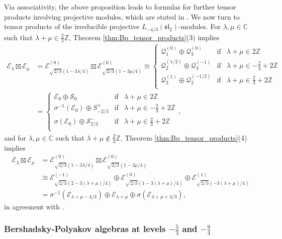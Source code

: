 \documentclass[11pt, reqno]{amsart}
\theoremstyle{definition}\newtheorem{defi}[thm]{Definition}
\theoremstyle{definition}\newtheorem{rem}[thm]{Remark}
\theoremstyle{definition}\newtheorem{exam}[thm]{Example}
\theoremstyle{definition}\newtheorem{assum}[thm]{Assumption}
\newcommand{\cE}{\mathcal{E}}
\newcommand{\cS}{\mathcal{S}}
\newcommand{\cQ}{\mathcal{Q}}
\newcommand{\CC}{\mathbb{C}}
\newcommand{\ZZ}{\mathbb{Z}}
\newcommand{\tens}{\boxtimes}
\begin{document}
Via associativity, the above proposition leads to formulas for further tensor products involving projective modules, which are stated in \cite[Equation 5.27]{CR1}. We now turn to tensor products of the irreducible projective $L_{-4/3}(\mathfrak{sl}_2)$-modules. For $\lambda,\mu\in\CC$ such that $\lambda+\mu\in\frac{2}{3}\ZZ$, Theorem \ref{thm:Bp_tensor_products}(3) implies
\begin{align*}
\cE_\lambda\tens\cE_\mu & = \cE^{(0)}_{\overline{\sqrt{2/3}(1-3\lambda/4)}}\tens\cE^{(0)}_{\overline{\sqrt{2/3}(1-3\mu/4)}} \cong \left\lbrace\begin{array}{lll}
\cQ_1^{(0)}\oplus\cQ_3^{(0)} & \text{if} & \lambda+\mu\in 2\ZZ\\
\cQ_2^{(1/2)}\oplus\cQ_3^{(-1)} & \text{if} & \lambda+\mu\in -\frac{2}{3}+2\ZZ\\
\cQ_3^{(1)}\oplus\cQ_2^{(-1/2)} & \text{if} & \lambda+\mu\in\frac{2}{3}+2\ZZ\\
\end{array}\right. \nonumber\\
& =\left\lbrace\begin{array}{lll}
\cE_0\oplus\cS_0 & \text{if} & \lambda+\mu\in 2\ZZ\\
\sigma^{-1}(\cE_0) \oplus S_{-2/3}^+& \text{if} & \lambda+\mu\in -\frac{2}{3}+2\ZZ\\
\sigma(\cE_0)\oplus \cS_{2/3}^- & \text{if} & \lambda+\mu\in\frac{2}{3}+2\ZZ\\
\end{array} \right. ,
\end{align*}
and for $\lambda,\mu\in\CC$ such that $\lambda+\mu\notin\frac{2}{3}\ZZ$, Theorem \ref{thm:Bp_tensor_products}(4) implies
\begin{align*}
\cE_\lambda\tens\cE_\mu & = \cE^{(0)}_{\overline{\sqrt{2/3}(1-3\lambda/4)}}\tens\cE^{(0)}_{\overline{\sqrt{2/3}(1-3\mu/4)}}\nonumber\\
& \cong \cE^{(-1)}_{\overline{\sqrt{2/3}(2-3(\lambda+\mu)/4)}}\oplus\cE^{(0)}_{\overline{\sqrt{2/3}(1-3(\lambda+\mu)/4)}}\oplus\cE^{(1)}_{\overline{\sqrt{2/3}(-3(\lambda+\mu)/4)}}\nonumber\\
&=\sigma^{-1}(\cE_{\lambda+\mu-4/3})\oplus\cE_{\lambda+\mu}\oplus\sigma(\cE_{\lambda+\mu+4/3}),
\end{align*}
in agreement with \cite[Equation 5.22]{CR1}.

\subsubsection{Bershadsky-Polyakov algebras at levels \texorpdfstring{$-\frac{5}{3}$}{-5/3} and \texorpdfstring{$-\frac{9}{4}$}{-9/4}}
\end{document}
